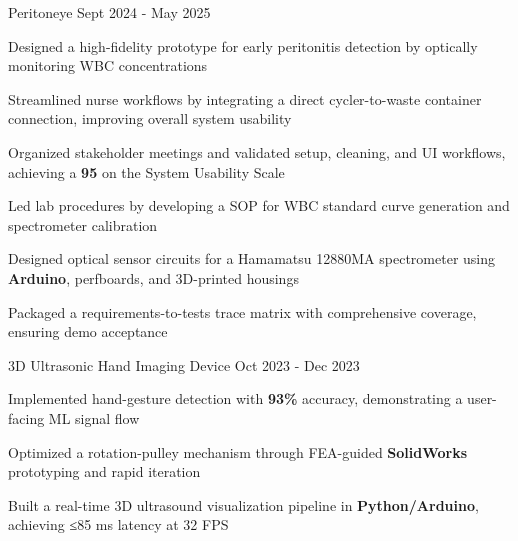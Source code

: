 \documentclass[11pt, a4paper]{russell}
\begin{document}
\begin{cventries}
\cvproject
  {Peritoneye} %
  {Sept 2024 - May 2025} %
  {
    \begin{cvitems}
        \item {Designed a high-fidelity prototype for early peritonitis detection by optically monitoring WBC concentrations}
        \item {Streamlined nurse workflows by integrating a direct cycler-to-waste container connection, improving overall system usability}
        \item {Organized stakeholder meetings and validated setup, cleaning, and UI workflows, achieving a \textbf{95} on the System Usability Scale} 
        \item {Led lab procedures by developing a SOP for WBC standard curve generation and spectrometer calibration}
        \item {Designed optical sensor circuits for a Hamamatsu 12880MA spectrometer using \textbf{Arduino}, perfboards, and 3D-printed housings}
        \item {Packaged a requirements-to-tests trace matrix with comprehensive coverage, ensuring demo acceptance}
    \end{cvitems}
  }

\cvproject
  {3D Ultrasonic Hand Imaging Device} %
  {Oct 2023 - Dec 2023} %
  {
    \begin{cvitems}
        \item {Implemented hand-gesture detection with \textbf{93\%} accuracy, demonstrating a user-facing ML signal flow}
        \item {Optimized a rotation-pulley mechanism through FEA-guided \textbf{SolidWorks} prototyping and rapid iteration}
        \item {Built a real-time 3D ultrasound visualization pipeline in \textbf{Python/Arduino}, achieving ≤85 ms latency at 32 FPS}
    \end{cvitems}
  }
\end{cventries}

\begin{cvskills}
\end{cvskills}

\vspace*{\fill}
\end{document}
